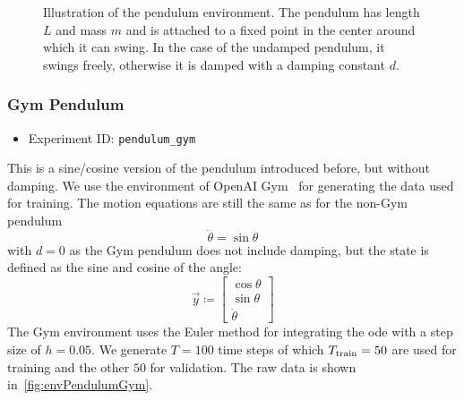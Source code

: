 			\begin{figure}
				\centering
				\tikzSimplePendulum
				\caption{Illustration of the pendulum environment. The pendulum has length \(L\) and mass \(m\) and is attached to a fixed point in the center around which it can swing. In the case of the undamped pendulum, it swings freely, otherwise it is damped with a damping constant \(d\).}
				\label{fig:envPendulumSketch}
			\end{figure}

		\subsubsection{Gym Pendulum}
			\begin{itemize}
				\item Experiment ID: \texttt{pendulum\_gym}
			\end{itemize}

			This is a sine/cosine version of the pendulum introduced before, but without damping. We use the environment of OpenAI Gym~\cite{brockmanOpenAIGym2016} for generating the data used for training. The motion equations are still the same as for the non-Gym pendulum
			\begin{equation*}
				\ddot{\theta} = \sin\theta
			\end{equation*}
			with \( d = 0 \) as the Gym pendulum does not include damping, but the state is defined as the sine and cosine of the angle:
			\begin{equation*}
				\vec{y} \coloneqq
					\begin{bmatrix}
						\cos\theta \\
						\sin\theta \\
						\dot{\theta}
					\end{bmatrix}
			\end{equation*}
			The Gym environment uses the Euler method for integrating the \ac{ode} with a step size of \( h = 0.05 \). We generate \( T = 100 \) time steps of which \( T_{\mathrm{train}} = 50 \) are used for training and the other \(50\) for validation. The raw data is shown in~\autoref{fig:envPendulumGym}.

